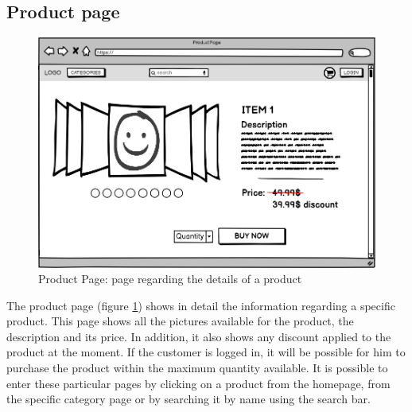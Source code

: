 \subsection{Product page}
    \begin{figure}[H]
        \centering
        \includegraphics[width=\textwidth,height=0.7\textheight,keepaspectratio]{mockups/productPageMockup.png}
            \caption{Product Page: page regarding the details of a product}
            \label{fig:ProductPage}
    \end{figure}

The product page (figure \ref{fig:ProductPage}) shows in detail the information regarding a specific product.
This page shows all the pictures available for the product, the description and its price.
In addition, it also shows any discount applied to the product at the moment.
If the customer is logged in, it will be possible for him to purchase the product within the maximum quantity available. It is possible to enter these particular pages by clicking on a product from the homepage, from the specific category page or by searching it by name using the search bar.

